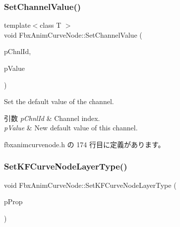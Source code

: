 \subsubsection{\texorpdfstring{Set\+Channel\+Value()}{SetChannelValue()}\hspace{0.1cm}{\footnotesize\ttfamily [2/2]}}
{\footnotesize\ttfamily template$<$class T $>$ \\
void Fbx\+Anim\+Curve\+Node\+::\+Set\+Channel\+Value (\begin{DoxyParamCaption}\item[{unsigned int}]{p\+Chnl\+Id,  }\item[{T}]{p\+Value }\end{DoxyParamCaption})\hspace{0.3cm}{\ttfamily [inline]}}

Set the default value of the channel. 
\begin{DoxyParams}{引数}
{\em p\+Chnl\+Id} & Channel index. \\
\hline
{\em p\+Value} & New default value of this channel. \\
\hline
\end{DoxyParams}


 fbxanimcurvenode.\+h の 174 行目に定義があります。

\mbox{\label{class_fbx_anim_curve_node_a9d266fe30162053141dd131a1005abf2}} 
\subsubsection{\texorpdfstring{Set\+K\+F\+Curve\+Node\+Layer\+Type()}{SetKFCurveNodeLayerType()}}
{\footnotesize\ttfamily void Fbx\+Anim\+Curve\+Node\+::\+Set\+K\+F\+Curve\+Node\+Layer\+Type (\begin{DoxyParamCaption}\item[{\hyperlink{class_fbx_property}{Fbx\+Property} \&}]{p\+Prop }\end{DoxyParamCaption})}

\mbox{\label{class_fbx_anim_curve_node_a16fee78283fbd1d530e1e80a2bcb166a}} 
